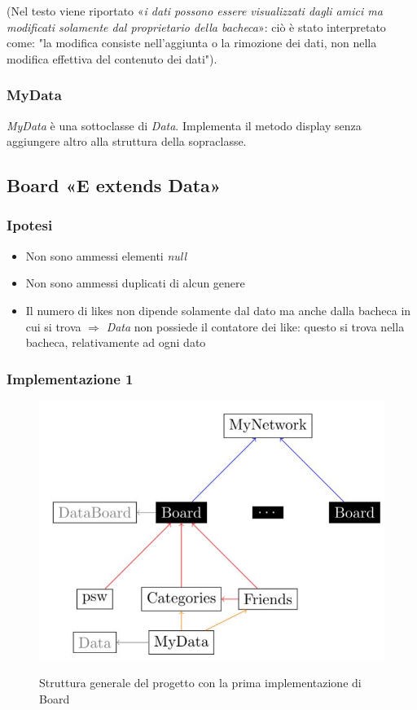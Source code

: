 \documentclass[10pt, a4paper]{article}
\begin{document}
\begin{footnotesize}
(Nel testo viene riportato «\textit{i dati possono essere
visualizzati dagli amici ma modificati solamente dal proprietario della bacheca}»: ciò è stato interpretato come: "la modifica consiste nell'aggiunta o la rimozione dei dati, non nella  modifica effettiva del contenuto dei dati").
\end{footnotesize}
\subsubsection{MyData}
\textit{MyData} è una sottoclasse di \textit{Data}. Implementa il metodo display{} senza aggiungere altro alla struttura della sopraclasse.
\clearpage
\subsection{Board «E extends Data» }
\subsubsection{Ipotesi}
\begin{itemize}
\item Non sono ammessi elementi \textit{null}
\item Non sono ammessi duplicati di alcun genere
\item Il numero di likes non dipende solamente dal dato ma anche dalla bacheca in cui si trova $\Rightarrow$ \textit{Data} non possiede il contatore dei like: questo si trova nella bacheca, relativamente ad ogni dato
\end{itemize}

\subsubsection{Implementazione 1}
\begin{figure}[h!]
	\centering
	\includegraphics[scale=0.4]{diag1}
	\label{fig:diag1}
	\caption{Struttura generale del progetto con la prima implementazione di Board}
\end{figure}
\end{document}
